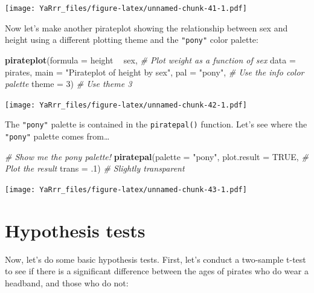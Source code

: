 \documentclass[]{book}
\newenvironment{Shaded}{\begin{snugshade}}{\end{snugshade}}
\newcommand{\KeywordTok}[1]{\textcolor[rgb]{0.13,0.29,0.53}{\textbf{#1}}}
\newcommand{\DataTypeTok}[1]{\textcolor[rgb]{0.13,0.29,0.53}{#1}}
\newcommand{\DecValTok}[1]{\textcolor[rgb]{0.00,0.00,0.81}{#1}}
\newcommand{\StringTok}[1]{\textcolor[rgb]{0.31,0.60,0.02}{#1}}
\newcommand{\CommentTok}[1]{\textcolor[rgb]{0.56,0.35,0.01}{\textit{#1}}}
\newcommand{\OtherTok}[1]{\textcolor[rgb]{0.56,0.35,0.01}{#1}}
\newcommand{\OperatorTok}[1]{\textcolor[rgb]{0.81,0.36,0.00}{\textbf{#1}}}
\newcommand{\NormalTok}[1]{#1}
\theoremstyle{definition}
\theoremstyle{definition}
\theoremstyle{remark}
\begin{document}
\texttt{[image: YaRrr\_files/figure-latex/unnamed-chunk-41-1.pdf]}

Now let's make another pirateplot showing the relationship between sex
and height using a different plotting theme and the \texttt{"pony"}
color palette:

\begin{Shaded}
\begin{Highlighting}[]
\KeywordTok{pirateplot}\NormalTok{(}\DataTypeTok{formula =}\NormalTok{ height }\OperatorTok{~}\StringTok{ }\NormalTok{sex,               }\CommentTok{# Plot weight as a function of sex}
           \DataTypeTok{data =}\NormalTok{ pirates,                       }
           \DataTypeTok{main =} \StringTok{"Pirateplot of height by sex"}\NormalTok{,}
           \DataTypeTok{pal =} \StringTok{"pony"}\NormalTok{,                         }\CommentTok{# Use the info color palette}
           \DataTypeTok{theme =} \DecValTok{3}\NormalTok{)                            }\CommentTok{# Use theme 3}
\end{Highlighting}
\end{Shaded}

\texttt{[image: YaRrr\_files/figure-latex/unnamed-chunk-42-1.pdf]}

The \texttt{"pony"} palette is contained in the \texttt{piratepal()}
function. Let's see where the \texttt{"pony"} palette comes from\ldots{}

\begin{Shaded}
\begin{Highlighting}[]
\CommentTok{# Show me the pony palette!}
\KeywordTok{piratepal}\NormalTok{(}\DataTypeTok{palette =} \StringTok{"pony"}\NormalTok{,}
          \DataTypeTok{plot.result =} \OtherTok{TRUE}\NormalTok{,   }\CommentTok{# Plot the result}
          \DataTypeTok{trans =}\NormalTok{ .}\DecValTok{1}\NormalTok{)           }\CommentTok{# Slightly transparent}
\end{Highlighting}
\end{Shaded}

\texttt{[image: YaRrr\_files/figure-latex/unnamed-chunk-43-1.pdf]}

\section{Hypothesis tests}\label{hypothesis-tests}

Now, let's do some basic hypothesis tests. First, let's conduct a
two-sample t-test to see if there is a significant difference between
the ages of pirates who do wear a headband, and those who do not:
\end{document}
